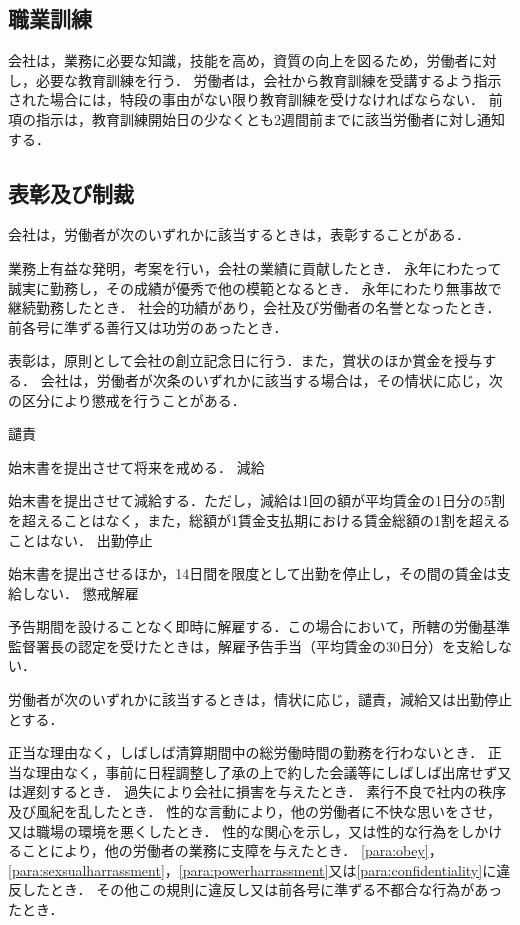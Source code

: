 \documentclass[11pt,a4paper]{jsarticle}
\begin{document}
\subsection{職業訓練}
会社は，業務に必要な知識，技能を高め，資質の向上を図るため，労働者に対し，必要な教育訓練を行う．
\term
労働者は，会社から教育訓練を受講するよう指示された場合には，特段の事由がない限り教育訓練を受けなければならない．
\term
前項の指示は，教育訓練開始日の少なくとも2週間前までに該当労働者に対し通知する．

\subsection{表彰及び制裁}
会社は，労働者が次のいずれかに該当するときは，表彰することがある．
\begin{enumerate}
	\itm 業務上有益な発明，考案を行い，会社の業績に貢献したとき．
	\itm 永年にわたって誠実に勤務し，その成績が優秀で他の模範となるとき．
	\itm 永年にわたり無事故で継続勤務したとき．
	\itm 社会的功績があり，会社及び労働者の名誉となったとき．
	\itm 前各号に準ずる善行又は功労のあったとき．
\end{enumerate}
\term
表彰は，原則として会社の創立記念日に行う．また，賞状のほか賞金を授与する．
会社は，労働者が次条のいずれかに該当する場合は，その情状に応じ，次の区分により懲戒を行うことがある．
\begin{enumerate}
	\itm 譴責\par 始末書を提出させて将来を戒める．
	\itm 減給\par 始末書を提出させて減給する．ただし，減給は1回の額が平均賃金の1日分の5割を超えることはなく，また，総額が1賃金支払期における賃金総額の1割を超えることはない．
	\itm 出勤停止\par 始末書を提出させるほか，14日間を限度として出勤を停止し，その間の賃金は支給しない．
	\itm 懲戒解雇\par 予告期間を設けることなく即時に解雇する．この場合において，所轄の労働基準監督署長の認定を受けたときは，解雇予告手当（平均賃金の30日分）を支給しない．
\end{enumerate}
労働者が次のいずれかに該当するときは，情状に応じ，譴責，減給又は出勤停止とする．
\label{para:disciplinary}
\begin{enumerate}
	\itm 正当な理由なく，しばしば清算期間中の総労働時間の勤務を行わないとき．
	\itm 正当な理由なく，事前に日程調整し了承の上で約した会議等にしばしば出席せず又は遅刻するとき．
	\itm 過失により会社に損害を与えたとき．
	\itm 素行不良で社内の秩序及び風紀を乱したとき．
	\itm 性的な言動により，他の労働者に不快な思いをさせ，又は職場の環境を悪くしたとき．
	\itm 性的な関心を示し，又は性的な行為をしかけることにより，他の労働者の業務に支障を与えたとき．
	\itm \ref{para:obey}，\ref{para:sexsualharrassment}，\ref{para:powerharrassment}又は\ref{para:confidentiality}に違反したとき．
	\itm その他この規則に違反し又は前各号に準ずる不都合な行為があったとき．
\end{enumerate}
\end{document}
